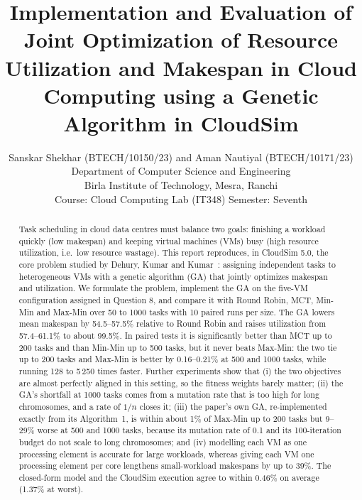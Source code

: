 \documentclass[journal,onecolumn,12pt]{IEEEtran}
\begin{document}
\title{Implementation and Evaluation of Joint Optimization of Resource Utilization and Makespan in Cloud Computing using a Genetic Algorithm in CloudSim}

\author{Sanskar Shekhar (BTECH/10150/23) and Aman Nautiyal (BTECH/10171/23)\\
Department of Computer Science and Engineering\\
Birla Institute of Technology, Mesra, Ranchi\\
Course: Cloud Computing Lab (IT348) \quad Semester: Seventh}


\maketitle

\begin{abstract}
Task scheduling in cloud data centres must balance two goals: finishing a workload quickly (low makespan) and keeping virtual machines (VMs) busy (high resource utilization, i.e.\ low resource wastage). This report reproduces, in CloudSim 5.0, the core problem studied by Dehury, Kumar and Kumar~\cite{dehury}: assigning independent tasks to heterogeneous VMs with a genetic algorithm (GA) that jointly optimizes makespan and utilization. We formulate the problem, implement the GA on the five-VM configuration assigned in Question 8, and compare it with Round Robin, MCT, Min-Min and Max-Min over 50 to 1000 tasks with 10 paired runs per size. The GA lowers mean makespan by 54.5--57.5\% relative to Round Robin and raises utilization from 57.4--61.1\% to about 99.5\%. In paired tests it is significantly better than MCT up to 200 tasks and than Min-Min up to 500 tasks, but it never beats Max-Min: the two tie up to 200 tasks and Max-Min is better by 0.16--0.21\% at 500 and 1000 tasks, while running 128 to 5\,250 times faster. Further experiments show that (i) the two objectives are almost perfectly aligned in this setting, so the fitness weights barely matter; (ii) the GA's shortfall at 1000 tasks comes from a mutation rate that is too high for long chromosomes, and a rate of $1/n$ closes it; (iii) the paper's own GA, re-implemented exactly from its Algorithm~1, is within about 1\% of Max-Min up to 200 tasks but 9--29\% worse at 500 and 1000 tasks, because its mutation rate of 0.1 and its 100-iteration budget do not scale to long chromosomes; and (iv) modelling each VM as one processing element is accurate for large workloads, whereas giving each VM one processing element per core lengthens small-workload makespans by up to 39\%. The closed-form model and the CloudSim execution agree to within 0.46\% on average (1.37\% at worst).
\end{abstract}
\end{document}
